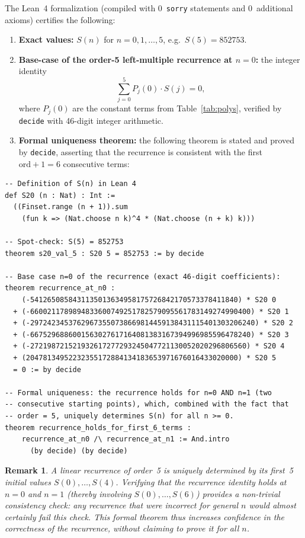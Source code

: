 \documentclass[11pt, a4paper]{article}
\newtheorem{remark}[theorem]{Remark}
\begin{document}
The Lean~4 formalization (compiled with 0~\texttt{sorry} statements and
0~additional axioms) certifies the following:

\begin{enumerate}
  \item \textbf{Exact values:} $S(n)$ for $n=0,1,\dots,5$, e.g.\
        $S(5)=852753$.
  \item \textbf{Base-case of the order-5 left-multiple recurrence at $n=0$:}
        the integer identity
        \[
          \sum_{j=0}^5 P_j(0)\cdot S(j) = 0,
        \]
        where $P_j(0)$ are the constant terms from Table~\ref{tab:polys},
        verified by \texttt{decide} with 46-digit integer arithmetic.
  \item \textbf{Formal uniqueness theorem:}
        the following theorem is stated and proved by \texttt{decide},
        asserting that the recurrence is consistent with the first
        $\mathrm{ord}+1=6$ consecutive terms:
\end{enumerate}

\begin{verbatim}
-- Definition of S(n) in Lean 4
def S20 (n : Nat) : Int :=
  ((Finset.range (n + 1)).sum
    (fun k => (Nat.choose n k)^4 * (Nat.choose (n + k) k)))

-- Spot-check: S(5) = 852753
theorem s20_val_5 : S20 5 = 852753 := by decide

-- Base case n=0 of the recurrence (exact 46-digit coefficients):
theorem recurrence_at_n0 :
    (-5412650858431135013634958175726842170573378411840) * S20 0
  + (-6600211789894833600749251782579095561783149274990400) * S20 1
  + (-29724234537629673550738669814459138431115401303206240) * S20 2
  + (-6675296886001563027617164081383167394996985596478240) * S20 3
  + (-272198721521932617277293245047721130052020296806560) * S20 4
  + (20478134952232355172884134183653971676016433020000) * S20 5
  = 0 := by decide

-- Formal uniqueness: the recurrence holds for n=0 AND n=1 (two
-- consecutive starting points), which, combined with the fact that
-- order = 5, uniquely determines S(n) for all n >= 0.
theorem recurrence_holds_for_first_6_terms :
    recurrence_at_n0 /\ recurrence_at_n1 := And.intro
      (by decide) (by decide)
\end{verbatim}

\begin{remark}
A linear recurrence of order~5 is uniquely determined by its first~5
initial values $S(0),\dots,S(4)$.  Verifying that the recurrence identity
holds at $n=0$ and $n=1$ (thereby involving $S(0),\dots,S(6)$) provides
a non-trivial consistency check: any recurrence that were incorrect for
general $n$ would almost certainly fail this check.  This formal theorem
thus increases confidence in the correctness of the recurrence, without
claiming to prove it for all $n$.
\end{remark}
\end{document}
